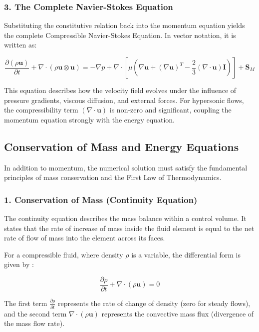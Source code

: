 \subsubsection*{3. The Complete Navier-Stokes Equation}
Substituting the constitutive relation back into the momentum equation yields the complete Compressible Navier-Stokes Equation. In vector notation, it is written as:

\begin{equation}
    \frac{\partial (\rho \mathbf{u})}{\partial t} + \nabla \cdot (\rho \mathbf{u} \otimes \mathbf{u}) = -\nabla p + \nabla \cdot \left[ \mu \left( \nabla \mathbf{u} + (\nabla \mathbf{u})^T - \frac{2}{3} (\nabla \cdot \mathbf{u}) \mathbf{I} \right) \right] + \mathbf{S}_M
\end{equation}

This equation describes how the velocity field evolves under the influence of pressure gradients, viscous diffusion, and external forces. For hypersonic flows, the compressibility term $(\nabla \cdot \mathbf{u})$ is non-zero and significant, coupling the momentum equation strongly with the energy equation.


\subsection{Conservation of Mass and Energy Equations}

In addition to momentum, the numerical solution must satisfy the fundamental principles of mass conservation and the First Law of Thermodynamics.

\subsubsection*{1. Conservation of Mass (Continuity Equation)}
The continuity equation describes the mass balance within a control volume. It states that the rate of increase of mass inside the fluid element is equal to the net rate of flow of mass into the element across its faces.
\par
For a compressible fluid, where density $\rho$ is a variable, the differential form is given by \cite{versteeg2007cfd}:

\begin{equation}
    \frac{\partial \rho}{\partial t} + \nabla \cdot (\rho \mathbf{u}) = 0
\end{equation}

The first term $\frac{\partial \rho}{\partial t}$ represents the rate of change of density (zero for steady flows), and the second term $\nabla \cdot (\rho \mathbf{u})$ represents the convective mass flux (divergence of the mass flow rate).

